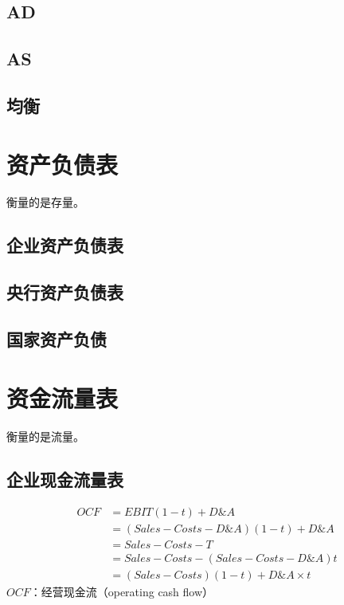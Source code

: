 \documentclass[12pt]{book}
\begin{document}
\section{AD}

\section{AS}

\section{均衡}





\chapter{资产负债表}

衡量的是存量。

\section{企业资产负债表}



\section{央行资产负债表}

\section{国家资产负债}












\chapter{资金流量表}

衡量的是流量。




\section{企业现金流量表}



\begin{align*}
    OCF & = EBIT(1-t) + D\&A \\
        & = (Sales-Costs-D\&A)(1-t)+D\&A \\
        & = Sales-Costs-T\ \\
        & = Sales-Costs-(Sales-Costs-D\&A)t\\
        & = (Sales-Costs)(1-t)+D\&A\times t
\end{align*}
$OCF$：经营现金流（operating cash flow）
    
\end{document}
